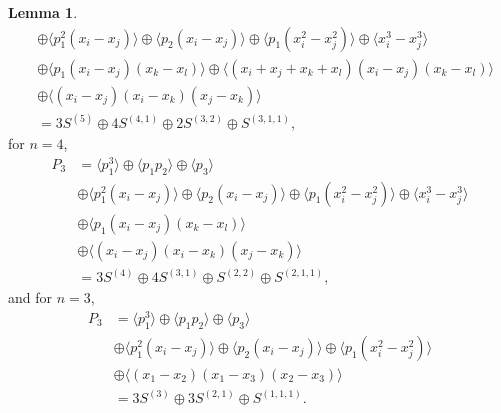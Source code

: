 \documentclass[11pt]{amsart}
\theoremstyle{definition}
\newtheorem{lemma}[theorem]{Lemma}
\begin{document}
\begin{lemma}
\begin{align*}
        &\oplus \langle p_1^2(x_i - x_j) \rangle \oplus \langle p_2(x_i - x_j) \rangle \oplus \langle p_1(x_i^2 - x_j^2) \rangle \oplus \langle x_i^3 - x_j^3 \rangle \\
        &\oplus \langle p_1(x_i-x_j)(x_k-x_l) \rangle \oplus \langle (x_i+x_j+x_k+x_l)(x_i-x_j)(x_k-x_l) \rangle \\
        &\oplus \langle (x_i-x_j)(x_i-x_k)(x_j-x_k) \rangle \\
        &= 3S^{(5)} \oplus 4S^{(4,1)} \oplus 2S^{(3,2)} \oplus S^{(3,1,1)},
    \end{align*}
    for $n=4$,
    \begin{align*}
        P_3 &= \langle p_1^3 \rangle \oplus \langle p_1 p_2 \rangle \oplus \langle p_3 \rangle \\
        &\oplus \langle p_1^2(x_i - x_j) \rangle \oplus \langle p_2(x_i - x_j) \rangle \oplus \langle p_1(x_i^2 - x_j^2) \rangle \oplus \langle x_i^3 - x_j^3 \rangle \\
        &\oplus \langle p_1(x_i-x_j)(x_k-x_l) \rangle \\
        &\oplus \langle (x_i-x_j)(x_i-x_k)(x_j-x_k) \rangle \\
        &= 3S^{(4)} \oplus 4S^{(3,1)} \oplus S^{(2,2)} \oplus S^{(2,1,1)},
    \end{align*}
    and for $n=3$,
    \begin{align*}
        P_3 &= \langle p_1^3 \rangle \oplus \langle p_1 p_2 \rangle \oplus \langle p_3 \rangle \\
        &\oplus \langle p_1^2(x_i - x_j) \rangle \oplus \langle p_2(x_i - x_j) \rangle \oplus \langle p_1(x_i^2 - x_j^2) \rangle \\
        &\oplus \langle (x_1-x_2)(x_1-x_3)(x_2-x_3) \rangle \\
        &= 3S^{(3)} \oplus 3S^{(2,1)} \oplus S^{(1,1,1)}.
    \end{align*}
\end{lemma}
\end{document}
